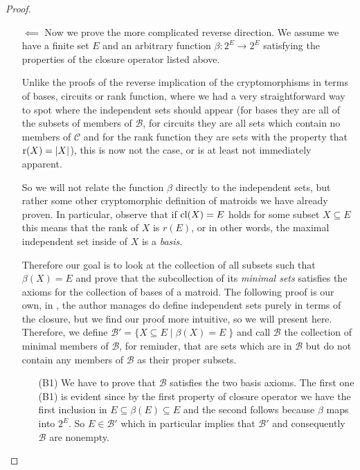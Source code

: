 \begin{proof}
\begin{enumerate}
    \item[$\impliedby$] Now we prove the more complicated reverse direction. We assume we have a finite set $E$ and an arbitrary function $\beta : 2^E \to 2^E$ satisfying the properties of the closure operator listed above.

    Unlike the proofs of the reverse implication of the cryptomorphisms in terms of bases, circuits or rank function, where we had a very straightforward way to spot where the independent sets should appear (for bases they are all of the subsets of members of $\mathcal{B}$, for circuits they are all sets which contain no members of $\mathcal{C}$ and for the rank function they are sets with the property that $\operatorname{r}(X) = |X|$), this is now not the case, or is at least not immediately apparent.

    So we will not relate the function $\beta$ directly to the independent sets, but rather some other cryptomorphic definition of matroids we have already proven. In particular, observe that if $\mathrm{cl}(X) = E$ holds for some subset $X \subseteq E$ this means that the rank of $X$ is $r(E)$, or in other words, the maximal independent set inside of $X$ is a \textit{basis.}

    Therefore our goal is to look at the collection of all subsets such that $\beta(X)= E$ and prove that the subcollection of its \textit{minimal sets} satisfies the axioms for the collection of bases of a matroid. The following proof is our own, in \cite[p. 27]{oxley1}, the author manages do define independent sets purely in terms of the closure, but we find our proof more intuitive, so we will present here. Therefore, we define $\mathcal{B}' = \{X \subseteq E\; |\; \beta(X) = E\;\}$ and call $\mathcal{B}$ the collection of minimal members of $\mathcal{B}$, for reminder, that are sets which are in $\mathcal{B}$ but do not contain any members of $\mathcal{B}$ as their proper subsets.


\begin{enumerate}

\item[(B1)] We have to prove that $\mathcal{B}$ satisfies the two basis axioms. The first one (B1) is evident since by the first property of closure operator we have the first inclusion in $E\subseteq\beta(E) \subseteq E$ and the second follows because $\beta$ maps into $2^E$. So $E \in \mathcal{B}'$ which in particular implies that $\mathcal{B}'$ and consequently $\mathcal{B}$ are nonempty.


\end{enumerate}
\end{enumerate}
\end{proof}

